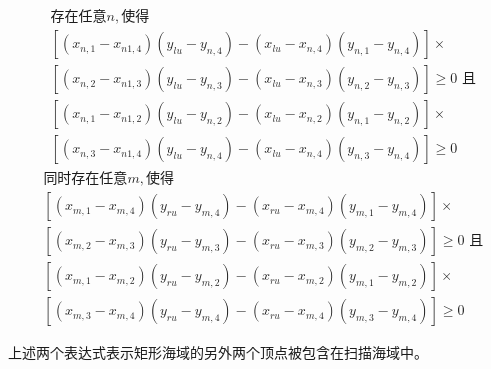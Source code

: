 \documentclass[12pt,a4paper]{article}
\begin{document}
	$$
	\begin{aligned}
		&\text{存在任意}n, \text{使得}\\
		& {\left[\left(x_{n, 1}-x_{n 1,4}\right)\left(y_{l u}-y_{n, 4}\right)-\left(x_{l u}-x_{n, 4}\right)\left(y_{n, 1}-y_{n, 4}\right)\right] \times} \\
		& {\left[\left(x_{n, 2}-x_{n 1,3}\right)\left(y_{l u}-y_{n, 3}\right)-\left(x_{l u}-x_{n, 3}\right)\left(y_{n, 2}-y_{n, 3}\right)\right] \geq 0 \text { 且 }} \\
		& {\left[\left(x_{n, 1}-x_{n 1,2}\right)\left(y_{l u}-y_{n, 2}\right)-\left(x_{l u}-x_{n, 2}\right)\left(y_{n, 1}-y_{n, 2}\right)\right] \times} \\
		& {\left[\left(x_{n, 3}-x_{n 1,4}\right)\left(y_{l u}-y_{n, 4}\right)-\left(x_{l u}-x_{n, 4}\right)\left(y_{n, 3}-y_{n, 4}\right)\right] \geq 0}
	\end{aligned}
	$$
	$$
	\begin{aligned}
		&\text{同时存在任意}m, \text{使得}\\
		& {\left[\left(x_{m, 1}-x_{m, 4}\right)\left(y_{r u}-y_{m, 4}\right)-\left(x_{r u}-x_{m, 4}\right)\left(y_{m, 1}-y_{m, 4}\right)\right] \times} \\
		& {\left[\left(x_{m, 2}-x_{m, 3}\right)\left(y_{r u}-y_{m, 3}\right)-\left(x_{r u}-x_{m, 3}\right)\left(y_{m, 2}-y_{m, 3}\right)\right] \geq 0 \text { 且 }} \\
		& {\left[\left(x_{m, 1}-x_{m, 2}\right)\left(y_{r u}-y_{m, 2}\right)-\left(x_{r u}-x_{m, 2}\right)\left(y_{m, 1}-y_{m, 2}\right)\right] \times} \\
		& {\left[\left(x_{m, 3}-x_{m, 4}\right)\left(y_{r u}-y_{m, 4}\right)-\left(x_{r u}-x_{m, 4}\right)\left(y_{m, 3}-y_{m, 4}\right)\right] \geq 0}
	\end{aligned}
	$$
	
	上述两个表达式表示矩形海域的另外两个顶点被包含在扫描海域中。
	
\end{document}
